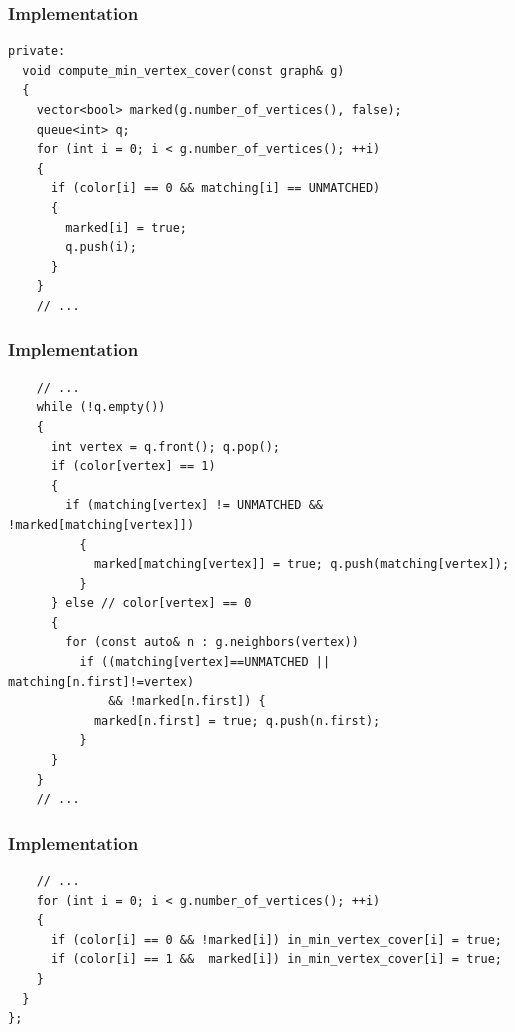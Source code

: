 \documentclass{beamer}
\newcommand{\uvalink}[2]{UVa Online Judge (http://uva.onlinejudge.org)
  problem number \href{#2}{\textcolor{blue}{#1}.}}
\newcounter{exo}
\newcommand{\exo}{
  \addtocounter{exo}{1}
  Exercice \arabic{exo}
}
\begin{document}
\begin{frame}[containsverbatim]
\frametitle{Implementation}
\scriptsize

\begin{lstlisting}
private:
  void compute_min_vertex_cover(const graph& g)
  {
    vector<bool> marked(g.number_of_vertices(), false);
    queue<int> q;
    for (int i = 0; i < g.number_of_vertices(); ++i)
    {
      if (color[i] == 0 && matching[i] == UNMATCHED)
      {
        marked[i] = true;
        q.push(i);
      }
    }
    // ...
\end{lstlisting}

\end{frame}


\begin{frame}[containsverbatim]
\frametitle{Implementation}
\scriptsize

\begin{lstlisting}
    // ...
    while (!q.empty())
    {
      int vertex = q.front(); q.pop();
      if (color[vertex] == 1)
      {
        if (matching[vertex] != UNMATCHED && !marked[matching[vertex]])
          {
            marked[matching[vertex]] = true; q.push(matching[vertex]);
          }
      } else // color[vertex] == 0
      {
        for (const auto& n : g.neighbors(vertex))
          if ((matching[vertex]==UNMATCHED || matching[n.first]!=vertex)
              && !marked[n.first]) {
            marked[n.first] = true; q.push(n.first);
          }
      }
    }
    // ...
\end{lstlisting}

\end{frame}

\begin{frame}[containsverbatim]
\frametitle{Implementation}
\scriptsize

\begin{lstlisting}
    // ...
    for (int i = 0; i < g.number_of_vertices(); ++i)
    {
      if (color[i] == 0 && !marked[i]) in_min_vertex_cover[i] = true;
      if (color[i] == 1 &&  marked[i]) in_min_vertex_cover[i] = true;
    }
  }
};
\end{lstlisting}

\end{frame}

\end{document}
